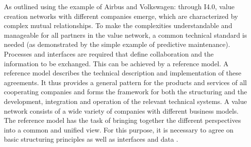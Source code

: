 As outlined using the example of Airbus and Volkswagen: through \ac{I4.0}, value creation networks with different companies emerge, which are characterized by complex mutual relationships. To make the complexities understandable and manageable for all partners in the value network, a common technical standard is needed (as demonstrated by the simple example of predictive maintenance). Processes and interfaces are required that define collaboration and the information to be exchanged. This can be achieved by a reference model. A reference model describes the technical description and implementation of these agreements. It thus provides a general pattern for the products and services of all cooperating companies and forms the framework for both the structuring and the development, integration and operation of the relevant technical systems. A value network consists of a wide variety of companies with different business models. The reference model has the task of bringing together the different perspectives into a common and unified view. For this purpose, it is necessary to agree on basic structuring principles as well as interfaces and data \cite[p. 34]{vomBrocke2015Referenzmodellierung.Konstruktionsprozessen}.

